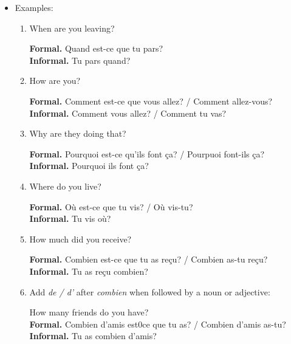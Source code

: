 \documentclass{book}
\begin{document}
\begin{itemize}
            \item Examples:
                \begin{enumerate}
                    \item When are you leaving?
                        \begin{center}
                            \textbf{Formal.} Quand est-ce que tu pars? \\
                            \textbf{Informal.} Tu pars quand?
                        \end{center}
                    \item How are you?
                        \begin{center}
                            \textbf{Formal.} Comment est-ce que vous allez? / Comment allez-vous? \\
                            \textbf{Informal.} Comment vous allez? / Comment tu vas?
                        \end{center}
                    \item Why are they doing that?
                        \begin{center}
                            \textbf{Formal.} Pourquoi est-ce qu'ils font ça? / Pourpuoi font-ils ça? \\
                            \textbf{Informal.} Pourquoi ils font ça? 
                        \end{center}
                    \item Where do you live?
                        \begin{center}
                            \textbf{Formal.} Où est-ce que tu vis? / Où vis-tu? \\
                            \textbf{Informal.} Tu vis où?
                        \end{center}
                    \item How much did you receive?
                        \begin{center}
                            \textbf{Formal.} Combien est-ce que tu as reçu? / Combien as-tu reçu? \\
                            \textbf{Informal.} Tu as reçu combien? 
                        \end{center}
                    \item Add \textit{de / d'} after \textit{combien} when followed by a noun or adjective:
                        \begin{center}
                            How many friends do you have? \\
                            \textbf{Formal.} Combien d'amis est0ce que tu as? / Combien d'amis as-tu? \\
                            \textbf{Informal.} Tu as combien d'amis?
                        \end{center}
                \end{enumerate}
        \end{itemize}
\end{document}
